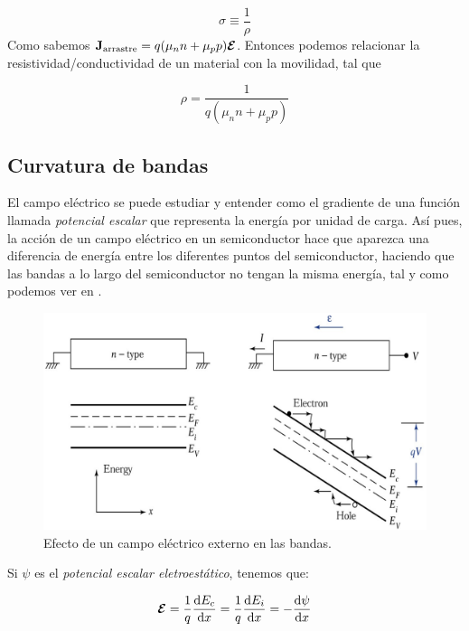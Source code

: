\begin{equation}
	\sigma \equiv \frac{1}{\rho}
\end{equation}
Como sabemos $\mathbf{J}_{\text{arrastre}}=q(\mu_nn+\mu_pp)\boldsymbol{\mathcal{E}}$. Entonces podemos relacionar la resistividad/conductividad de un material con la movilidad, tal que

\begin{equation}
	\rho = \frac{1}{q(\mu_n n + \mu_p p)}
\end{equation}

\subsection{Curvatura de bandas}

El campo eléctrico se puede estudiar y entender como el gradiente de una función llamada \textit{potencial escalar} que representa la energía por unidad de carga. Así pues, la acción de un campo eléctrico en un semiconductor hace que aparezca una diferencia de energía entre los diferentes puntos del semiconductor, haciendo que las bandas a lo largo del semiconductor no tengan la misma energía, tal y como podemos ver en .

\begin{figure}[h!] \centering
	\includegraphics[width=0.8\linewidth]{Cuerpo/Ch_02/02_Campo_E.png}
	\caption{Efecto de un campo eléctrico externo en las bandas.}
	\label{Fig:02-03}
\end{figure}

Si $\psi$ es el \textit{potencial escalar eletroestático}, tenemos que:

\begin{equation}
	\boldsymbol{\mathcal{E}} = \frac{1}{q} \frac{\mathrm{d} E_c}{\mathrm{d} x}= \frac{1}{q} \frac{\mathrm{d} E_i}{\mathrm{d} x}=- \frac{\mathrm{d} \psi}{\mathrm{d} x}
\end{equation}




